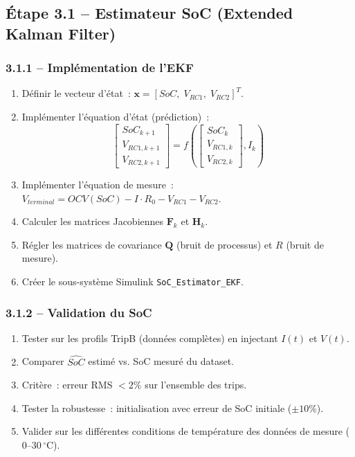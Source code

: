\documentclass[a4paper,12pt]{article}
\begin{document}
\subsection{Étape 3.1 -- Estimateur SoC (Extended Kalman Filter)}

\subsubsection{3.1.1 -- Implémentation de l'EKF}
\begin{enumerate}[nosep]
  \item Définir le vecteur d'état~: $\mathbf{x} = [SoC,\; V_{RC1},\; V_{RC2}]^T$.
  \item Implémenter l'équation d'état (prédiction)~:
    \[
    \begin{bmatrix} SoC_{k+1} \\ V_{RC1,k+1} \\ V_{RC2,k+1} \end{bmatrix}
    = f\left(\begin{bmatrix} SoC_k \\ V_{RC1,k} \\ V_{RC2,k} \end{bmatrix}, I_k \right)
    \]
  \item Implémenter l'équation de mesure~: $V_{terminal} = OCV(SoC) - I \cdot R_0 - V_{RC1} - V_{RC2}$.
  \item Calculer les matrices Jacobiennes $\mathbf{F}_k$ et $\mathbf{H}_k$.
  \item Régler les matrices de covariance $\mathbf{Q}$ (bruit de processus) et $R$ (bruit de mesure).
  \item Créer le sous-système Simulink \texttt{SoC\_Estimator\_EKF}.
\end{enumerate}

\subsubsection{3.1.2 -- Validation du SoC}
\begin{enumerate}[nosep]
  \item Tester sur les profils TripB (données complètes) en injectant $I(t)$ et $V(t)$.
  \item Comparer $\hat{SoC}$ estimé vs. SoC mesuré du dataset.
  \item Critère~: erreur RMS $<2\%$ sur l'ensemble des trips.
  \item Tester la robustesse~: initialisation avec erreur de SoC initiale ($\pm 10\%$).
  \item Valider sur les différentes conditions de température des données de mesure ($0$--$30\,^{\circ}$C).
\end{enumerate}
\end{document}
